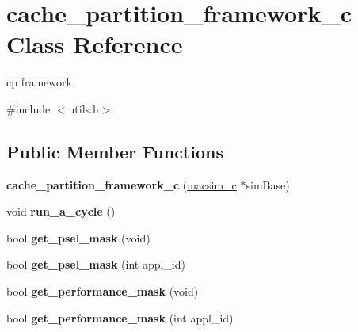 \hypertarget{classcache__partition__framework__c}{
\section{cache\_\-partition\_\-framework\_\-c Class Reference}
\label{classcache__partition__framework__c}
}


cp framework  




{\ttfamily \#include $<$utils.h$>$}

\subsection*{Public Member Functions}
\begin{DoxyCompactItemize}
\item 
\hypertarget{classcache__partition__framework__c_aafbcf8f30f766239a5e90e45d9558384}{
{\bfseries cache\_\-partition\_\-framework\_\-c} (\hyperlink{classmacsim__c}{macsim\_\-c} $\ast$simBase)}
\label{classcache__partition__framework__c_aafbcf8f30f766239a5e90e45d9558384}

\item 
\hypertarget{classcache__partition__framework__c_a0f6dd39b9e3ea43b49aeb7e9a8b9ec24}{
void {\bfseries run\_\-a\_\-cycle} ()}
\label{classcache__partition__framework__c_a0f6dd39b9e3ea43b49aeb7e9a8b9ec24}

\item 
\hypertarget{classcache__partition__framework__c_a96f81712d7401049e42ecea44ba5ba09}{
bool {\bfseries get\_\-psel\_\-mask} (void)}
\label{classcache__partition__framework__c_a96f81712d7401049e42ecea44ba5ba09}

\item 
\hypertarget{classcache__partition__framework__c_a63c526d7dddf1cf189b8dc2295c07615}{
bool {\bfseries get\_\-psel\_\-mask} (int appl\_\-id)}
\label{classcache__partition__framework__c_a63c526d7dddf1cf189b8dc2295c07615}

\item 
\hypertarget{classcache__partition__framework__c_a27c7b52168c8bc0f9917b4e593c0c105}{
bool {\bfseries get\_\-performance\_\-mask} (void)}
\label{classcache__partition__framework__c_a27c7b52168c8bc0f9917b4e593c0c105}

\item 
\hypertarget{classcache__partition__framework__c_a41128a4b35d201b6fdebab37381a2e10}{
bool {\bfseries get\_\-performance\_\-mask} (int appl\_\-id)}
\label{classcache__partition__framework__c_a41128a4b35d201b6fdebab37381a2e10}


\end{DoxyCompactItemize}
